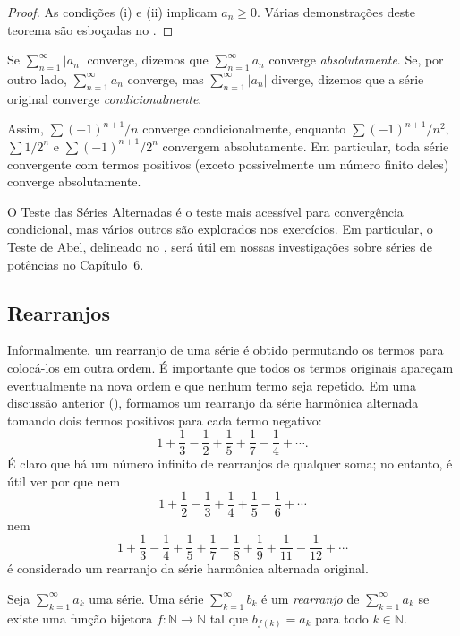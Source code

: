 \begin{proof}
As condições (i) e (ii) implicam $a_n\geq0$. Várias demonstrações deste teorema são esboçadas no .
\end{proof}

 
\begin{definition}\label{def:convergencia-absoluta}
Se $\sum_{n=1}^{\infty}|a_n|$ converge, dizemos que $\sum_{n=1}^{\infty}a_n$ converge \textit{absolutamente}. Se, por outro lado, $\sum_{n=1}^{\infty}a_n$ converge, mas $\sum_{n=1}^{\infty}|a_n|$ diverge, dizemos que a série original converge \textit{condicionalmente}.
\end{definition}

Assim, $\sum(-1)^{n+1}/n$ converge condicionalmente, enquanto $\sum(-1)^{n+1}/n^2$, $\sum1/2^n$ e $\sum(-1)^{n+1}/2^n$ convergem absolutamente. Em particular, toda série convergente com termos positivos (exceto possivelmente um número finito deles) converge absolutamente.

O Teste das Séries Alternadas é o teste mais acessível para convergência condicional, mas vários outros são explorados nos exercícios. Em particular, o Teste de Abel, delineado no , será útil em nossas investigações sobre séries de potências no Capítulo~6.

\subsection{Rearranjos}

Informalmente, um rearranjo de uma série é obtido permutando os termos para colocá-los em outra ordem. É importante que todos os termos originais apareçam eventualmente na nova ordem e que nenhum termo seja repetido. Em uma discussão anterior (), formamos um rearranjo da série harmônica alternada tomando dois termos positivos para cada termo negativo:
\[
1+\frac13-\frac12+\frac15+\frac17-\frac14+\cdots.
\]
É claro que há um número infinito de rearranjos de qualquer soma; no entanto, é útil ver por que nem
\[
1+\frac12-\frac13+\frac14+\frac15-\frac16+\cdots
\]
nem
\[
1+\frac13-\frac14+\frac15+\frac17-\frac18+\frac19+\frac1{11}-\frac1{12}+\cdots
\]
é considerado um rearranjo da série harmônica alternada original.

\begin{definition}[Rearranjo]\label{def:rearranjo}
Seja $\sum_{k=1}^{\infty}a_k$ uma série. Uma série $\sum_{k=1}^{\infty}b_k$ é um \textit{rearranjo} de $\sum_{k=1}^{\infty}a_k$ se existe uma função bijetora $f\colon\mathbb{N}\to\mathbb{N}$ tal que $b_{f(k)}=a_k$ para todo $k\in\mathbb{N}$.
\end{definition}

